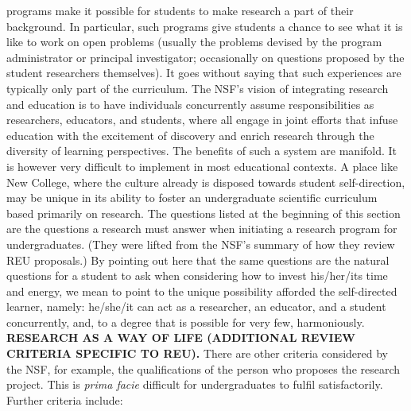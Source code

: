 programs make it possible for students to make research a part of
their background.  In particular, such programs give students a chance
to see what it is like to work on open problems (usually the problems
devised by the program administrator or principal investigator;
occasionally on questions proposed by the student researchers
themselves).  It goes without saying that such experiences are
typically only part of the curriculum.  The NSF's vision of
integrating research and education is to have individuals concurrently
assume responsibilities as researchers, educators, and students, where
all engage in joint efforts that infuse education with the excitement
of discovery and enrich research through the diversity of learning
perspectives.  The benefits of such a system are manifold.  It is
however very difficult to implement in most educational contexts.  A
place like New College, where the culture already is disposed towards
student self-direction, may be unique in its ability to foster an
undergraduate scientific curriculum based primarily on research.  The
questions listed at the beginning of this section are the questions a
research must answer when initiating a research program for
undergraduates.  (They were lifted from the NSF's summary of how they
review REU proposals.)  By pointing out here that the same questions
are the natural questions for a student to ask when considering how to
invest his/her/its time and energy, we mean to point to the unique
possibility afforded the self-directed learner, namely: he/she/it can
act as a researcher, an educator, and a student concurrently, and, to
a degree that is possible for very few, harmoniously.\\

\noindent \textbf{RESEARCH AS A WAY OF LIFE (ADDITIONAL REVIEW CRITERIA SPECIFIC TO REU).}
There are other criteria considered by the NSF, for example, the
qualifications of the person who proposes the research project.  This
is \emph{prima facie} difficult for undergraduates to fulfil
satisfactorily.  Further criteria include:

